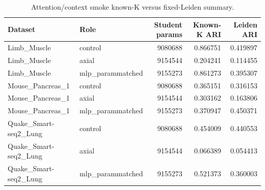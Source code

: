 \begin{table}[ht]
\centering
\caption{Attention/context smoke known-K versus fixed-Leiden summary.}
\label{tab:generated-attention-smoke-nonoracle}
\begin{tabular}{llrrr}
\toprule
Dataset & Role & Student params & Known-K ARI & Leiden ARI \\
\midrule
Limb\_Muscle & control & 9080688 & 0.866751 & 0.419897 \\
Limb\_Muscle & axial & 9154544 & 0.204241 & 0.114455 \\
Limb\_Muscle & mlp\_parammatched & 9155273 & 0.861273 & 0.395307 \\
Mouse\_Pancreas\_1 & control & 9080688 & 0.365151 & 0.316153 \\
Mouse\_Pancreas\_1 & axial & 9154544 & 0.303162 & 0.163806 \\
Mouse\_Pancreas\_1 & mlp\_parammatched & 9155273 & 0.370947 & 0.450371 \\
Quake\_Smart-seq2\_Lung & control & 9080688 & 0.454009 & 0.440553 \\
Quake\_Smart-seq2\_Lung & axial & 9154544 & 0.066389 & 0.054413 \\
Quake\_Smart-seq2\_Lung & mlp\_parammatched & 9155273 & 0.521373 & 0.360003 \\
\bottomrule
\end{tabular}
\end{table}
